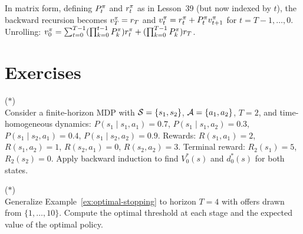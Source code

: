\documentclass[11pt,a4paper]{article}
\begin{document}
\begin{remark}
\label{rem:matrix-form-fh}
In matrix form, defining $P_t^\pi$ and $r_t^\pi$ as in
Lesson~39 (but now indexed by $t$), the backward recursion becomes
$v_T^\pi = r_T$ and
$v_t^\pi = r_t^\pi + P_t^\pi v_{t+1}^\pi$ for
$t = T-1, \ldots, 0$.
Unrolling: $v_0^\pi = \sum_{t=0}^{T-1} (\prod_{k=0}^{t-1}
P_k^\pi) r_t^\pi + (\prod_{k=0}^{T-1} P_k^\pi) r_T$.
\end{remark}


\section{Exercises}
\label{sec:exercises}

\begin{exercise} \textnormal{(\(*\))} \\
Consider a finite-horizon MDP with $\mathcal{S} = \{s_1, s_2\}$,
$\mathcal{A} = \{a_1, a_2\}$, $T = 2$, and time-homogeneous dynamics:
$P(s_1 \mid s_1, a_1) = 0.7$, $P(s_1 \mid s_1, a_2) = 0.3$,
$P(s_1 \mid s_2, a_1) = 0.4$, $P(s_1 \mid s_2, a_2) = 0.9$.
Rewards: $R(s_1, a_1) = 2$, $R(s_1, a_2) = 1$, $R(s_2, a_1) = 0$,
$R(s_2, a_2) = 3$. Terminal reward: $R_2(s_1) = 5$, $R_2(s_2) = 0$.
Apply backward induction to find $V_0^*(s)$ and $d_0^*(s)$ for both
states.
\end{exercise}

\begin{exercise}
\textnormal{(\(*\))} \\
Generalize Example~\ref{ex:optimal-stopping} to horizon $T = 4$ with
offers drawn from $\{1, \ldots, 10\}$. Compute the optimal threshold
at each stage and the expected value of the optimal policy.
\end{exercise}
\end{document}
